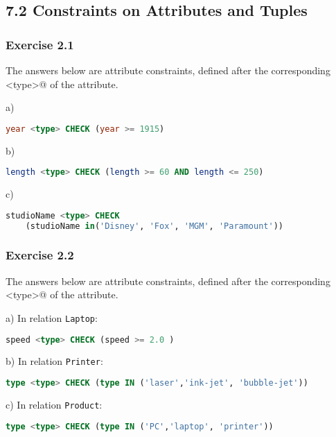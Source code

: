 \documentclass[../../main.tex]{subfiles}
\begin{document}
\subsection{7.2 Constraints on Attributes and Tuples}

\subsubsection*{Exercise 2.1}

The answers below are attribute constraints, defined after the corresponding \verb@<type>@
of the attribute.

a)

\begin{lstlisting}[language=sql]
  year <type> CHECK (year >= 1915)
\end{lstlisting}

b)

\begin{lstlisting}[language=sql]
  length <type> CHECK (length >= 60 AND length <= 250)
\end{lstlisting}

c)

\begin{lstlisting}[language=sql]
  studioName <type> CHECK
    (studioName in('Disney', 'Fox', 'MGM', 'Paramount'))
\end{lstlisting}

\subsubsection*{Exercise 2.2}

The answers below are attribute constraints, defined after the corresponding \verb@<type>@
of the attribute.

a) In relation \verb|Laptop|:

\begin{lstlisting}[language=sql]
  speed <type> CHECK (speed >= 2.0 )
\end{lstlisting}

b) In relation \verb|Printer|:

\begin{lstlisting}[language=sql]
  type <type> CHECK (type IN ('laser','ink-jet', 'bubble-jet'))
\end{lstlisting}

c) In relation \verb|Product|:

\begin{lstlisting}[language=sql]
  type <type> CHECK (type IN ('PC','laptop', 'printer'))
\end{lstlisting}
\end{document}
